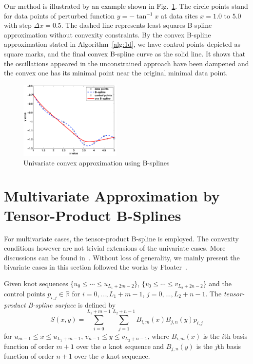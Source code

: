 \documentclass{sig-alternate}
\newcommand{\setR}{\mathbb{R}}
\begin{document}
Our method is illustrated by an example shown in Fig.~\ref{fig:1d}. 
The circle points stand for data points of
perturbed function $y=-\tan^{-1} x$ at data sites $x=1.0$ to $5.0$ with step
$\Delta x=0.5$. The dashed line represents least squares
B-spline approximation without convexity constraints. 
By the convex B-spline approximation stated in
Algorithm~\ref{alg:1d}, we have control points depicted as square
marks, and the final convex B-spline curve as the solid line. It shows
that the oscillations appeared in the unconstrained
approach have been dampened and the convex one has its minimal point
near the original minimal data point.

\begin{figure}[!tb]{\centering
\includegraphics[width=0.45\textwidth]{./figs/cvx1d}
\caption{Univariate convex approximation using B-splines}
\label{fig:1d}}
\end{figure}

\section{Multivariate Approximation by Tensor-Product B-Splines}
\label{sec:2d}
For multivariate cases, the tensor-product B-spline is employed. The
convexity conditions however are not trivial extensions of the
univariate cases. More discussions can be found in~\cite{Floater_99}. 
Without loss of generality, we mainly present the bivariate cases in
this section followed the works by Floater~\cite{Floater_93}.

Given knot sequences $\{u_0\leq\cdots\leq u_{L_1+2m-2}\}$,
$\{v_0\leq\cdots\leq v_{L_2+2n-2}\}$ and the control points
$p_{i,j}\in\setR$ for $i=0,\ldots,L_1+m-1$, $j=0,\ldots,L_2+n-1$.
The \emph{tensor-product B-spline surface} is defined by
\begin{equation}\label{eqn:tp}
S(x,y)=\sum_{i=0}^{L_1+m-1}{
\sum_{j=1}^{L_2+n-1}{B_{i,m}(x)B_{j,n}(y)p_{i,j}}}
\end{equation}
for $u_{m-1}\leq x\leq u_{L_1+m-1}$, $v_{n-1}\leq y\leq v_{L_2+n-1}$,
where $B_{i,m}(x)$ is the $i$th basis function of order $m+1$ over the
$u$ knot sequence and $B_{j,n}(y)$ is the $j$th basis function of
order $n+1$ over the $v$ knot sequence. 
\end{document}
